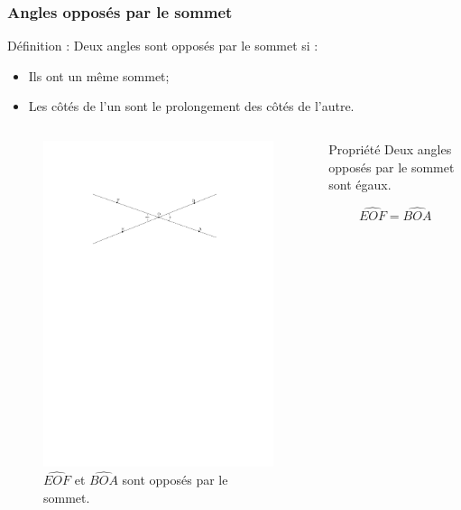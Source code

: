 \documentclass{beamer}
\begin{document}
\begin{frame}
  \frametitle{Angles opposés par le sommet}
  \begin{alertblock}{Définition :}	
    Deux angles sont opposés par le sommet si :
    \begin{itemize}
    \item Ils ont un même sommet;
    \item Les côtés de l'un sont le prolongement des côtés de l'autre.
    \end{itemize}
  \end{alertblock}
  \begin{columns}[t]
    \begin{column}{5cm}
      \begin{figure}[H]
        \centering
        \includegraphics[width=\linewidth]{5x10-angles/sources/opposes.pdf}
        \\$\widehat{EOF}$ et $\widehat{BOA}$ sont opposés par le sommet.    
      \end{figure} 
    \end{column}
    \begin{column}{5cm}
      \begin{block}{Propriété}
        Deux angles opposés par le sommet sont égaux.     
      \end{block}
      $$\widehat{EOF} = \widehat{BOA}$$ 
    \end{column}
  \end{columns} 
\end{frame}
\end{document}
